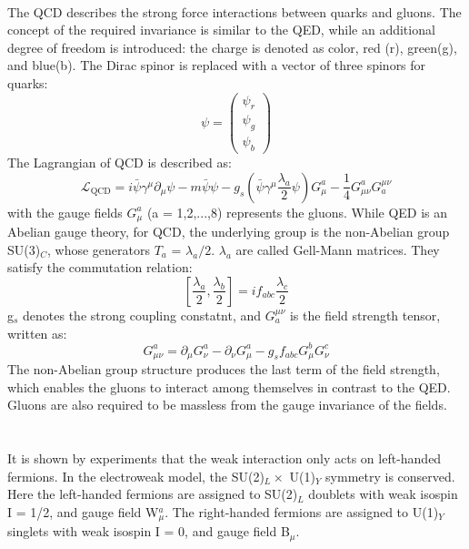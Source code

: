 \noindent\textbf{} \\ 
The QCD describes the strong force interactions between quarks and gluons. The concept of the required invariance is similar to the QED, while an additional degree of freedom is introduced: the charge is denoted as color, red (r), green(g), and blue(b). 
The Dirac spinor is replaced with a vector of three spinors for quarks:
\begin{equation}
\psi=\left(\begin{array}{c}
\psi_{r} \\
\psi_{g} \\
\psi_{b}
\end{array}\right)
\end{equation}
The Lagrangian of QCD is described as:
\begin{equation}
\mathcal{L}_{\mathrm{QCD}}=i \bar{\psi} \gamma^{\mu} \partial_{\mu} \psi-m \bar{\psi} \psi-g_{s}\left(\bar{\psi} \gamma^{\mu} \frac{\lambda_{a}}{2} \psi\right) G_{\mu}^{a}-\frac{1}{4} G_{\mu \nu}^{a} G_{a}^{\mu \nu}
\end{equation}
with the gauge fields $G_{\mu}^{a}$ (a = 1,2,...,8) represents the gluons.
While QED is an Abelian gauge theory, for QCD, the underlying group is the non-Abelian group SU(3)$_C$, whose generators $T_a$ = $\lambda_{a}/2$. 
$\lambda_{a}$ are called Gell-Mann matrices. They satisfy the commutation relation:
\begin{equation}
\left[\frac{\lambda_{a}}{2}, \frac{\lambda_{b}}{2}\right]=i f_{a b c} \frac{\lambda_{c}}{2}
\end{equation}
g$_s$ denotes the strong coupling constatnt, and $G_{a}^{\mu \nu}$ is the field strength tensor, written as:
\begin{equation}
G_{\mu \nu}^{a}=\partial_{\mu} G_{\nu}^{a}-\partial_{\nu} G_{\mu}^{a}-g_{s} f_{a b c} G_{\mu}^{b} G_{\nu}^{c}
\end{equation}
The non-Abelian group structure produces the last term of the field strength, which enables the gluons to interact among themselves in contrast to the QED. 
Gluons are also required to be massless from the gauge invariance of the fields.
\\ \\
\noindent\textbf{} \\
It is shown by experiments that the weak interaction only acts on left-handed fermions. In the electroweak model, the SU(2)$_L \times$ U(1)$_Y$ symmetry is conserved. Here the left-handed fermions are assigned to SU(2)$_L$ doublets with weak isospin I = 1/2, and gauge field W$^a_\mu$. The right-handed fermions are assigned to  U(1)$_Y$ singlets with weak isospin I = 0, and gauge field B$_\mu$.
